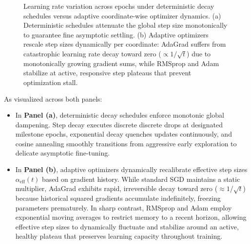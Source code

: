 \begin{figure}[H]
\begin{minipage}{0.48\linewidth}
\end{minipage}
\caption{Learning rate variation across epochs under deterministic decay schedules versus adaptive coordinate-wise optimizer dynamics. (a) Deterministic schedules attenuate the global step size monotonically to guarantee fine asymptotic settling. (b) Adaptive optimizers rescale step sizes dynamically per coordinate: AdaGrad suffers from catastrophic learning rate decay toward zero ($\propto 1/\sqrt{t}$) due to monotonically growing gradient sums, while RMSprop and Adam stabilize at active, responsive step plateaus that prevent optimization stall.}
\label{fig:learning_rate_variations_epochs}
\end{figure}

As visualized across both panels:
\begin{itemize}
  \item In \textbf{Panel (a)}, deterministic decay schedules enforce monotonic global dampening. Step decay executes discrete discrete drops at designated milestone epochs, exponential decay quenches updates continuously, and cosine annealing smoothly transitions from aggressive early exploration to delicate asymptotic fine-tuning.
  \item In \textbf{Panel (b)}, adaptive optimizers dynamically recalibrate effective step sizes $\alpha_{\text{eff}}(t)$ based on gradient history. While standard SGD maintains a static multiplier, AdaGrad exhibits rapid, irreversible decay toward zero ($\approx 1/\sqrt{t}$) because historical squared gradients accumulate indefinitely, freezing parameters prematurely. In sharp contrast, RMSprop and Adam employ exponential moving averages to restrict memory to a recent horizon, allowing effective step sizes to dynamically fluctuate and stabilize around an active, healthy plateau that preserves learning capacity throughout training.
\end{itemize}

